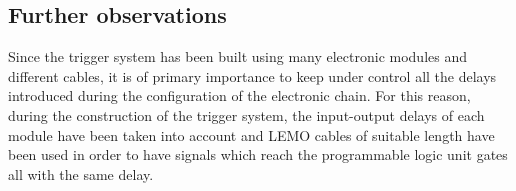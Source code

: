 \subsection{Further observations} \label{obs}
Since the trigger system has been built using many electronic modules and different cables, it is of primary importance to keep under control all the delays introduced during the configuration of the electronic chain. For this reason, during the construction of the trigger system, the input-output delays of each module have been taken into account and LEMO cables of suitable length have been used in order to have signals which reach the programmable logic unit gates all with the same delay.\\

